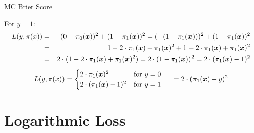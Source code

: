 \begin{vbframe}{MC Brier Score}
\begin{footnotesize}
    For $y = 1$:
  \begin{eqnarray*}
  L(y, \pi(x)) &=& (0-\pi_0(\bm{x}))^2 + (1-\pi_1(\bm{x}))^2 = (-(1 - \pi_1(\bm{x})))^2 + (1-\pi_1(\bm{x}))^2 \\
  &=& 1 - 2\cdot\pi_1(\bm{x})+ \pi_1(\bm{x})^2 + 1 - 2\cdot\pi_1(\bm{x})+ \pi_1(\bm{x})^2 \\
  &=& 2 \cdot (1 - 2\cdot\pi_1(\bm{x})+ \pi_1(\bm{x})^2) = 2 \cdot (1 - \pi_1(\bm{x}))^2 = 2 \cdot (\pi_1(\bm{x}) - 1)^2
  \end{eqnarray*}
  $$L(y, \pi(x)) = \begin{cases}
  2 \cdot \pi_1(\bm{x})^2 & \text{for } y = 0 \\
  2 \cdot (\pi_1(\bm{x}) - 1)^2 & \text{for } y = 1\\
  \end{cases}
    \hspace{0.5cm} = 2 \cdot (\pi_1(\bm{x}) - y)^2 $$
  \end{footnotesize}
\end{vbframe}

\section{Logarithmic Loss}

